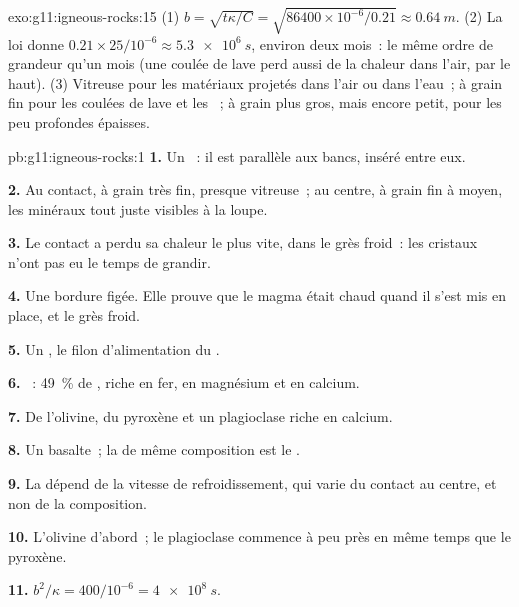 \begin{solution}{exo:g11:igneous-rocks:15}
(1) $b = \sqrt{t\kappa/C} = \sqrt{86400 \times 10^{-6}/0.21} \approx
\qty{0.64}{m}$.
(2) La loi donne $0.21 \times 25/10^{-6} \approx
\qty{5.3e6}{s}$, environ
deux mois~: le même ordre de grandeur qu'un mois (une coulée de lave perd
aussi de la chaleur dans l'air, par le haut). (3) Vitreuse pour les
matériaux projetés dans l'air ou dans l'eau~; à grain fin pour les coulées
de lave et les ~; à grain plus gros, mais encore petit, pour
les  peu profondes épaisses.
\end{solution}

\begin{solution}{pb:g11:igneous-rocks:1}
\textbf{1.} Un ~: il est parallèle aux bancs, inséré entre eux.

\textbf{2.} Au contact, à grain très fin, presque vitreuse~; au centre, à
grain fin à moyen, les minéraux tout juste visibles à la loupe.

\textbf{3.} Le contact a perdu sa chaleur le plus vite, dans le grès
froid~: les cristaux n'ont pas eu le temps de grandir.

\textbf{4.} Une bordure figée. Elle prouve que le magma était chaud quand
il s'est mis en place, et le grès froid.

\textbf{5.} Un , le filon d'alimentation du .

\textbf{6.} ~: \qty{49}{\percent} de , riche en fer, en
magnésium et en calcium.

\textbf{7.} De l'olivine, du pyroxène et un plagioclase riche en calcium.

\textbf{8.} Un basalte~; la  de même composition est le
.

\textbf{9.} La  dépend de la vitesse de refroidissement, qui varie du
contact au centre, et non de la composition.

\textbf{10.} L'olivine d'abord~; le plagioclase commence à peu près en même
temps que le pyroxène.

\textbf{11.} $b^2/\kappa = 400/10^{-6} = \qty{4e8}{s}$.


\end{solution}

